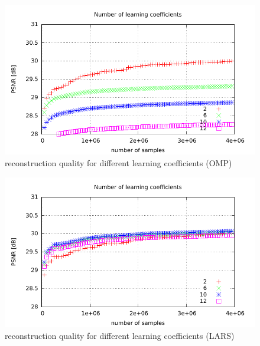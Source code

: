 \newpage
\begin{figure}[H]
\centering
\includegraphics[width =
1.0\textwidth]{../tests/results/coeffsConvergOMP.pdf}
\caption{reconstruction quality for different learning coefficients (OMP)}
\label{fig:coeffsOMP}
\end{figure}

\begin{figure}[H]
\centering
\includegraphics[width = 1.0\textwidth]{../tests/results/coeffsConverg.pdf}
\caption{reconstruction quality for different learning coefficients (LARS)}
\label{fig:coeffsLasso}
\end{figure}



